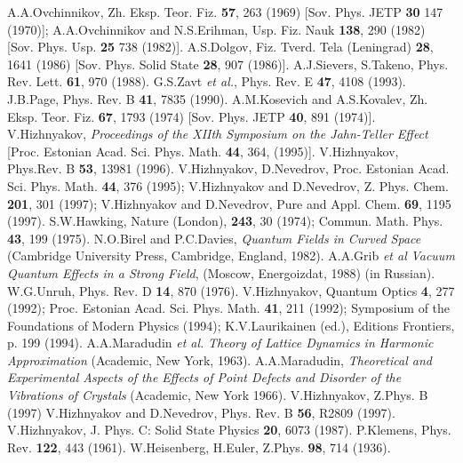 \begin{thebibliography}{99}
A.A.Ovchinnikov, Zh. Eksp. Teor. Fiz. {\bf 57}, 263 (1969)
[Sov. Phys. JETP {\bf 30} 147 (1970)];
A.A.Ovchinnikov and N.S.Erihman, Usp. Fiz. Nauk {\bf 138}, 290 (1982)
[Sov. Phys. Usp. {\bf 25} 738 (1982)].
A.S.Dolgov, Fiz. Tverd. Tela (Leningrad) {\bf 28}, 1641 (1986) 
[Sov. Phys. Solid State {\bf 28}, 907 (1986)]. 
A.J.Sievers, S.Takeno, Phys. Rev. Lett. {\bf 61}, 970 (1988).
G.S.Zavt {\it et al.}, Phys. Rev. E {\bf 47}, 4108 (1993). 
J.B.Page, Phys. Rev. B {\bf 41}, 7835 (1990). 
A.M.Kosevich and A.S.Kovalev, Zh. Eksp. Teor. Fiz. {\bf 67}, 1793 (1974)
[Sov. Phys. JETP {\bf 40}, 891 (1974)].
V.Hizhnyakov, {\it Proceedings of the  XIIth Symposium on the Jahn-Teller 
Effect} [Proc. Estonian Acad. Sci. Phys. Math. {\bf 44}, 364, (1995)]. 
V.Hizhnyakov, Phys.Rev. B {\bf 53}, 13981 (1996). 
V.Hizhnyakov, D.Nevedrov, Proc. Estonian Acad. Sci. Phys. Math. {\bf 44}, 
376 (1995);
V.Hizhnyakov and D.Nevedrov, Z. Phys. Chem. {\bf 201}, 301 (1997);
V.Hizhnyakov and D.Nevedrov, Pure and Appl. Chem. {\bf 69}, 1195 (1997).
S.W.Hawking, Nature (London),
{\bf 243}, 30 (1974); Commun. Math. Phys.  {\bf 43}, 199 (1975). 
N.O.Birel and P.C.Davies, {\it Quantum Fields in Curved Space}
(Cambridge University Press, Cambridge, England, 1982).  
A.A.Grib {\it et al} {\it Vacuum Quantum Effects in a Strong Field}, 
(Moscow, Energoizdat, 1988) (in Russian).  
W.G.Unruh, Phys. Rev. D {\bf 14}, 870 (1976). 
V.Hizhnyakov, Quantum Optics {\bf 4}, 277 (1992); Proc. Estonian
Acad.  Sci. Phys. Math. {\bf 41}, 211 (1992); 
Symposium of the Foundations of Modern Physics (1994); 
K.V.Laurikainen (ed.), Editions Frontiers, p. 
199 (1994).  
A.A.Maradudin {\it et al.} {\it Theory of Lattice Dynamics in 
Harmonic Approximation} (Academic, New York, 1963).  
A.A.Maradudin, {\it Theoretical and
Experimental Aspects of the Effects of Point Defects and Disorder of the 
Vibrations of Crystals} (Academic, New York 1966). 
V.Hizhnyakov, Z.Phys. B (1997)
V.Hizhnyakov and D.Nevedrov, Phys. Rev. B {\bf 56}, R2809 (1997).
V.Hizhnyakov, J. Phys. C: Solid State Physics {\bf 20}, 6073 (1987).  
P.Klemens, Phys. Rev. {\bf 122}, 443 (1961).
W.Heisenberg, H.Euler, Z.Phys. {\bf 98}, 714 (1936).

\end{thebibliography}
